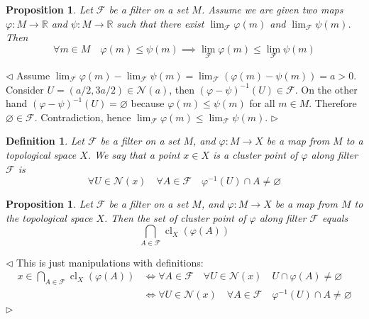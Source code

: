 \documentclass[12pt]{article}
\newtheorem{proposition}[theorem]{Proposition}
\newtheorem{definition}[theorem]{Definition}
\newenvironment{proof}{\par $\triangleleft$}{$\triangleright$}
\begin{document}
\begin{proposition} Let $\mathcal{F}$ be a filter on a set $M$. Assume we are
    given two maps $\varphi:M\to\mathbb{R}$ and $\psi:M\to\mathbb{R}$ such that
    there exist $\lim_{\mathcal{F}}\varphi(m)$ and $\lim_{\mathcal{F}}\psi(m)$.
    Then
    $$
        \forall m\in M\quad\varphi(m)\leq\psi(m) \implies
        \lim_{\mathcal{F}}\varphi(m)\leq\lim_{\mathcal{F}}\psi(m)
    $$
\end{proposition}
\begin{proof} Assume $\lim_{\mathcal{F}}\varphi(m)-\lim_{\mathcal{F}}\psi(m)=
        \lim_{\mathcal{F}}(\varphi(m)-\psi(m))=a>0$. Consider
    $U=(a/2,3a/2)\in\mathcal{N}(a)$, then
    ${(\varphi-\psi)}^{-1}(U)\in\mathcal{F}$. On the other hand
    ${(\varphi-\psi)}^{-1}(U)=\varnothing$ because $\varphi(m)\leq\psi(m)$
    for all $m\in M$. Therefore $\varnothing\in\mathcal{F}$. Contradiction,
    hence $\lim_{\mathcal{F}}\varphi(m)\leq\lim_{\mathcal{F}}\psi(m)$.
\end{proof}

\begin{definition}\label{DefClusterPointAlongTheFilter} Let $\mathcal{F}$ be a
    filter on  a set $M$, and $\varphi:M\to X$ be a map from $M$ to a
    topological space $X$. We say that a point $x\in X$ is a cluster point of
    $\varphi$ along filter $\mathcal{F}$ is
    $$
        \forall U\in\mathcal{N}(x)\quad \forall A\in\mathcal{F}
        \quad \varphi^{-1}(U)\cap A\neq\varnothing
    $$
\end{definition}

\begin{proposition}\label{PrClusterPointAlongTheFilterCharac} Let $\mathcal{F}$
    be a filter on  a set $M$, and $\varphi:M\to X$ be a map from $M$ to the
    topological space $X$. Then the set of cluster point of $\varphi$ along
    filter $\mathcal{F}$ equals
    $$
        \bigcap_{A\in\mathcal{F}} \operatorname{cl}_X(\varphi(A))
    $$
\end{proposition}
\begin{proof} This is just manipulations with definitions:
    $$
        \begin{aligned}
            x\in \bigcap_{A\in\mathcal{F}} \operatorname{cl}_X(\varphi(A))
             & \Longleftrightarrow
            \forall A\in\mathcal{F} \quad
            \forall U\in\mathcal{N}(x)
            \quad U\cap \varphi(A)\neq\varnothing      \\
             & \Longleftrightarrow
            \forall U\in\mathcal{N}(x)\quad
            \forall A\in\mathcal{F}
            \quad \varphi^{-1}(U)\cap A\neq\varnothing \\
        \end{aligned}
    $$
\end{proof}
\end{document}
